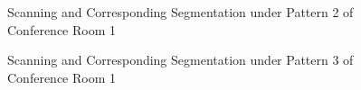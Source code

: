 \documentclass[11pt, a4paper,oneside,chapterprefix=false]{scrbook}
\begin{document}
\begin{figure}[H]
    \centering
      \label{fig:conf1 1 occluded} \hfill
     \label{fig:conf1 1 seg}
    \caption{Scanning and Corresponding Segmentation under Pattern 2 of Conference Room 1}
    \label{fig:conf1 1 occ and seg}
\end{figure}


\begin{figure}[H]
    \centering
      \label{fig:conf1 2 occluded} \hfill
     \label{fig:conf1 2 seg}
    \caption{Scanning and Corresponding Segmentation under Pattern 3 of Conference Room 1}
    \label{fig:conf1 2 occ and seg}
\end{figure}
\end{document}
